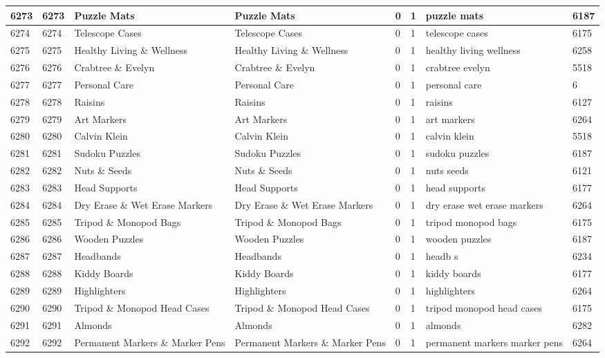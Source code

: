 \begin{longtable}{|l|l|l|l|l|l|l|l|}
6273 & 6273 & Puzzle Mats & Puzzle Mats & 0 & 1 & puzzle mats & 6187 \\ \hline 
6274 & 6274 & Telescope Cases & Telescope Cases & 0 & 1 & telescope cases & 6175 \\ \hline 
6275 & 6275 & Healthy Living \& Wellness & Healthy Living \& Wellness & 0 & 1 & healthy living wellness & 6258 \\ \hline 
6276 & 6276 & Crabtree \& Evelyn & Crabtree \& Evelyn & 0 & 1 & crabtree evelyn & 5518 \\ \hline 
6277 & 6277 & Personal Care & Personal Care & 0 & 1 & personal care & 6 \\ \hline 
6278 & 6278 & Raisins & Raisins & 0 & 1 & raisins & 6127 \\ \hline 
6279 & 6279 & Art Markers & Art Markers & 0 & 1 & art markers & 6264 \\ \hline 
6280 & 6280 & Calvin Klein & Calvin Klein & 0 & 1 & calvin klein & 5518 \\ \hline 
6281 & 6281 & Sudoku Puzzles & Sudoku Puzzles & 0 & 1 & sudoku puzzles & 6187 \\ \hline 
6282 & 6282 & Nuts \& Seeds & Nuts \& Seeds & 0 & 1 & nuts seeds & 6121 \\ \hline 
6283 & 6283 & Head Supports & Head Supports & 0 & 1 & head supports & 6177 \\ \hline 
6284 & 6284 & Dry Erase \& Wet Erase Markers & Dry Erase \& Wet Erase Markers & 0 & 1 & dry erase wet erase markers & 6264 \\ \hline 
6285 & 6285 & Tripod \& Monopod Bags & Tripod \& Monopod Bags & 0 & 1 & tripod monopod bags & 6175 \\ \hline 
6286 & 6286 & Wooden Puzzles & Wooden Puzzles & 0 & 1 & wooden puzzles & 6187 \\ \hline 
6287 & 6287 & Headbands & Headbands & 0 & 1 & headb s & 6234 \\ \hline 
6288 & 6288 & Kiddy Boards & Kiddy Boards & 0 & 1 & kiddy boards & 6177 \\ \hline 
6289 & 6289 & Highlighters & Highlighters & 0 & 1 & highlighters & 6264 \\ \hline 
6290 & 6290 & Tripod \& Monopod Head Cases & Tripod \& Monopod Head Cases & 0 & 1 & tripod monopod head cases & 6175 \\ \hline 
6291 & 6291 & Almonds & Almonds & 0 & 1 & almonds & 6282 \\ \hline 
6292 & 6292 & Permanent Markers \& Marker Pens & Permanent Markers \& Marker Pens & 0 & 1 & permanent markers marker pens & 6264 \\ \hline 

\end{longtable}
